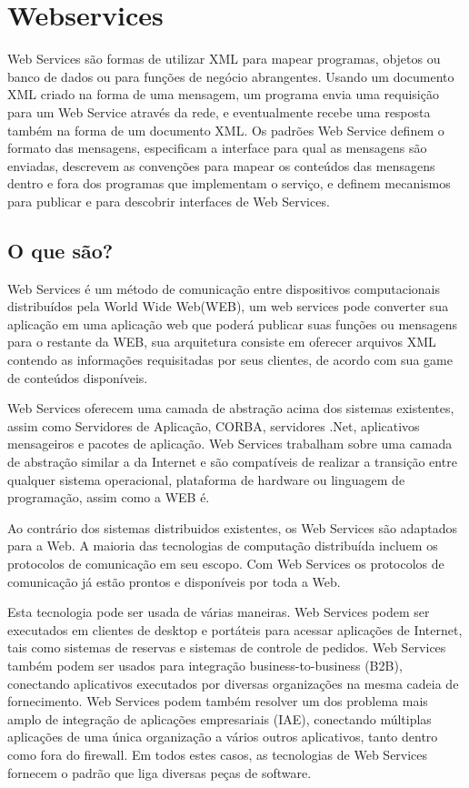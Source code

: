 \documentclass{acm_proc_article-sp}
\begin{document}
\section{Webservices}
		
		Web Services são formas de utilizar XML para mapear programas, objetos ou banco de dados ou para funções de negócio abrangentes. Usando um documento XML criado na forma de uma mensagem, um programa envia uma requisição para um Web Service através da rede, e eventualmente recebe uma resposta também na forma de um documento XML. Os padrões Web Service definem o formato das mensagens, especificam a interface para qual as mensagens são enviadas, descrevem as convenções para mapear os conteúdos das mensagens dentro e fora dos programas que implementam o serviço, e definem mecanismos para publicar e para descobrir interfaces de Web Services.  \cite{UNDERWEBSERVICES}

	\subsection{O que são?}
		Web Services é um método de comunicação entre dispositivos computacionais distribuídos pela World Wide Web(WEB), um web services pode converter sua aplicação em uma aplicação web que poderá publicar suas funções ou mensagens para o restante da WEB, sua arquitetura consiste em oferecer arquivos XML contendo as informações requisitadas por seus clientes, de acordo com sua game de conteúdos disponíveis.\cite{WEBS}
		
		Web Services oferecem uma camada de abstração acima dos sistemas existentes, assim como Servidores de Aplicação, CORBA, servidores .Net, aplicativos mensageiros e pacotes de aplicação. Web Services trabalham sobre 
		uma camada de abstração similar a da Internet e são compatíveis de realizar a transição entre qualquer sistema operacional, plataforma de hardware ou linguagem de programação, assim como a WEB é.
		
		Ao contrário dos sistemas distribuidos existentes, os Web Services são adaptados para a Web. A maioria das tecnologias de computação distribuída incluem os protocolos de comunicação em seu escopo. Com Web Services os protocolos de comunicação já estão prontos e disponíveis por toda a Web. 
		
		Esta tecnologia pode ser usada de várias maneiras. Web Services podem ser executados em clientes de desktop e portáteis para acessar aplicações de Internet, tais como sistemas de reservas e sistemas de controle de pedidos. Web Services também podem ser usados para integração business-to-business (B2B), conectando aplicativos executados por diversas organizações na mesma cadeia de fornecimento. Web Services podem também resolver um dos problema mais amplo de integração de aplicações empresariais (IAE), conectando múltiplas aplicações de uma única organização a vários outros aplicativos, tanto dentro como fora do firewall. Em todos estes casos, as tecnologias de Web Services fornecem o padrão que liga diversas peças de software. \cite{UNDERWEBSERVICES}
		
\end{document}
